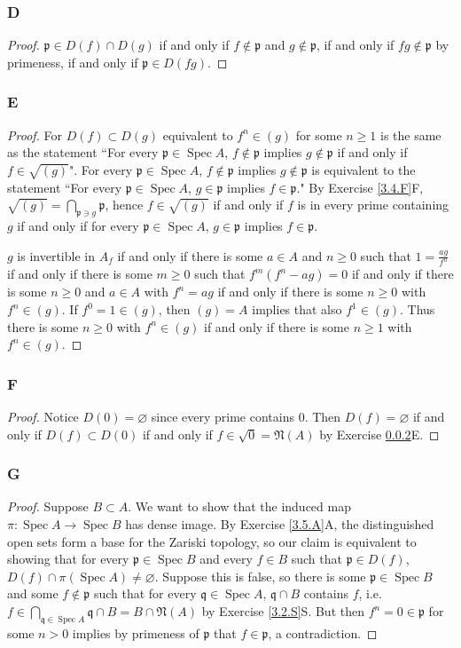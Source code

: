 \documentclass{article}
\newcommand{\frkp}{\mathfrak{p}}
\newcommand{\frkq}{\mathfrak{q}}
\newcommand{\frkN}{\mathfrak{N}}
\DeclareMathOperator{\Spec}{\mathrm{Spec}}
\let\emptyset\varnothing
\begin{document}
\subsubsection{D}\label{3.5.D}
\begin{proof}
    $\frkp \in D(f)\cap D(g)$ if and only if $f\notin \frkp$ and $g\notin \frkp$, if and only if $fg\notin \frkp$ by primeness, if and only if $\frkp \in D(fg)$.
\end{proof}
\subsubsection{E}\label{3.5.E}
\begin{proof}
    For $D(f)\subset D(g)$ equivalent to $f^n \in (g)$ for some $n\ge 1$ is the same as the statement ``For every $\frkp \in \Spec A$, $f\notin \frkp$ implies $g\notin \frkp$ if and only if $f\in \sqrt{(g)}$". For every $\frkp \in \Spec A$, $f\notin \frkp$ implies $g\notin \frkp$ is equivalent to the statement ``For every $\frkp \in \Spec A$, $g\in \frkp$ implies $f\in \frkp$." By Exercise \ref{3.4.F}F, $\sqrt {(g)} = \bigcap_{\frkp \ni g} \frkp$, hence $f\in \sqrt{(g)}$ if and only if $f$ is in every prime containing $g$ if and only if for every $\frkp \in \Spec A$, $g\in \frkp $ implies $f\in \frkp$.

     $g$ is invertible in $A_f$ if and only if there is some $a\in A$ and $n\ge 0$ such that $1 = \frac{ag}{f^n}$ if and only if there is some $m\ge 0$ such that $f^m(f^n-ag)=0$ if and only if there is some $n\ge 0$ and $a\in A$ with $f^n = ag$ if and only if there is some $n\ge 0$ with $f^n \in (g)$. If $f^0=1 \in (g)$, then $(g)=A$ implies that also $f^1 \in (g)$. Thus there is some $n\ge 0$ with $f^n\in (g)$ if and only if there is some $n\ge 1$ with $f^n \in (g)$.
\end{proof}
\subsubsection{F}\label{3.5.F}
\begin{proof}
    Notice $D(0)=\emptyset$ since every prime contains $0$. Then $D(f)=\emptyset$ if and only if $D(f)\subset D(0)$ if and only if $f\in \sqrt{0}=\frkN(A)$ by Exercise \ref{3.5.E}E.
\end{proof}
\subsubsection{G}\label{3.5.G}
\begin{proof}
    Suppose $B \subset A$. We want to show that the induced map $\pi:\Spec A \to \Spec B$ has dense image. By Exercise \ref{3.5.A}A, the distinguished open sets form a base for the Zariski topology, so our claim is equivalent to showing that for every $\frkp \in \Spec B$ and every $f\in B$ such that $\frkp \in D(f)$, $D(f)\cap \pi(\Spec A) \ne \emptyset$. Suppose this is false, so there is some $\frkp \in \Spec B$ and some $f\notin \frkp$ such that for every $\frkq \in \Spec A$, $\frkq \cap B$ contains $f$, i.e. $f\in \bigcap_{\frkq \in \Spec A} \frkq \cap B = B\cap \frkN(A)$ by Exercise \ref{3.2.S}S. But then $f^n=0 \in \frkp$ for some $n>0$ implies by primeness of $\frkp$ that $f\in \frkp$, a contradiction.
\end{proof}
\end{document}
